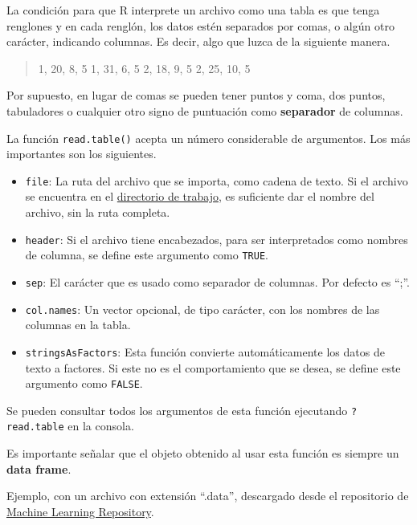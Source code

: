 \documentclass[
]{book}
\providecommand{\tightlist}{%
  \setlength{\itemsep}{0pt}\setlength{\parskip}{0pt}}
\begin{document}
La condición para que R interprete un archivo como una tabla es que tenga renglones y en cada renglón, los datos estén separados por comas, o algún otro carácter, indicando columnas. Es decir, algo que luzca de la siguiente manera.

\begin{quote}
1, 20, 8, 5
1, 31, 6, 5
2, 18, 9, 5
2, 25, 10, 5
\end{quote}

Por supuesto, en lugar de comas se pueden tener puntos y coma, dos puntos, tabuladores o cualquier otro signo de puntuación como \textbf{separador} de columnas.

La función \texttt{read.table()} acepta un número considerable de argumentos. Los más importantes son los siguientes.

\begin{itemize}
\tightlist
\item
  \texttt{file}: La ruta del archivo que se importa, como cadena de texto. Si el archivo se encuentra en el \protect\hyperlink{directorio-de-trabajo}{directorio de trabajo}, es suficiente dar el nombre del archivo, sin la ruta completa.\\
\item
  \texttt{header}: Si el archivo tiene encabezados, para ser interpretados como nombres de columna, se define este argumento como \texttt{TRUE}.
\item
  \texttt{sep}: El carácter que es usado como separador de columnas. Por defecto es ``;''.
\item
  \texttt{col.names}: Un vector opcional, de tipo carácter, con los nombres de las columnas en la tabla.\\
\item
  \texttt{stringsAsFactors}: Esta función convierte automáticamente los datos de texto a factores. Si este no es el comportamiento que se desea, se define este argumento como \texttt{FALSE}.
\end{itemize}

Se pueden consultar todos los argumentos de esta función ejecutando \texttt{?read.table} en la consola.

Es importante señalar que el objeto obtenido al usar esta función es siempre un \textbf{data frame}.

Ejemplo, con un archivo con extensión ``.data'', descargado desde el repositorio de \href{https://archive.ics.uci.edu/ml/datasets/Breast+Cancer+Wisconsin+(Diagnostic)}{Machine Learning Repository}.
\end{document}
